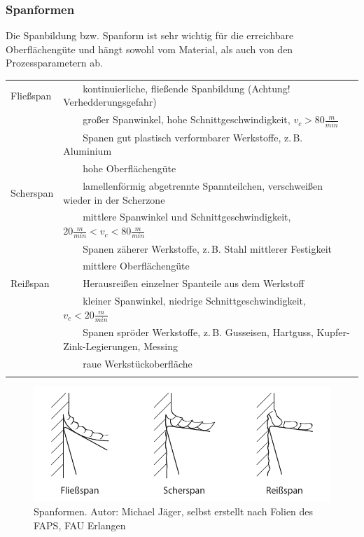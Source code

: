 \documentclass{\basedir/fablab-document}
\newcommand{\tabitem}{~~\llap{\textbullet}~~}
\begin{document}
\subsubsection{Spanformen}
Die Spanbildung bzw. Spanform ist sehr wichtig für die erreichbare Oberflächengüte und hängt sowohl vom Material, als auch von den Prozessparametern ab. \\[1em]
\begin{tabular}{ll}
    Fließspan		& \tabitem kontinuierliche, fließende Spanbildung (Achtung! Verhedderungsgefahr)													\\ 
								&	\tabitem großer Spanwinkel, hohe Schnittgeschwindigkeit, $v_c > 80 \frac{m}{min} $											\\
								&	\tabitem Spanen gut plastisch verformbarer Werkstoffe, z.\,B. Aluminium																		\\
								&	\tabitem hohe Oberflächengüte																																						\\ \addlinespace
    Scherspan		& \tabitem lamellenförmig abgetrennte Spannteilchen, verschweißen wieder in der Scherzone									\\ 
								&	\tabitem mittlere Spanwinkel und Schnittgeschwindigkeit, $20 \frac{m}{min} < v_c < 80 \frac{m}{min} $		\\
								&	\tabitem Spanen zäherer Werkstoffe, z.\,B. Stahl mittlerer Festigkeit 																		\\
								&	\tabitem mittlere Oberflächengüte																																				\\ \addlinespace
    Reißspan		& \tabitem Herausreißen einzelner Spanteile aus dem Werkstoff																							\\ 
								&	\tabitem kleiner Spanwinkel, niedrige Schnittgeschwindigkeit, $v_c < 20 \frac{m}{min} $									\\
								&	\tabitem Spanen spröder Werkstoffe, z.\,B. Gusseisen, Hartguss, Kupfer-Zink-Legierungen, Messing					\\
								&	\tabitem raue Werkstückoberfläche																																				\\ \addlinespace
\end{tabular}
\begin{figure}[ht]
\centering
\includegraphics[width = \linewidth]{img/spanformen}
\caption{Spanformen. Autor: Michael Jäger, selbst erstellt nach Folien des FAPS, FAU Erlangen}
\end{figure}
\end{document}
